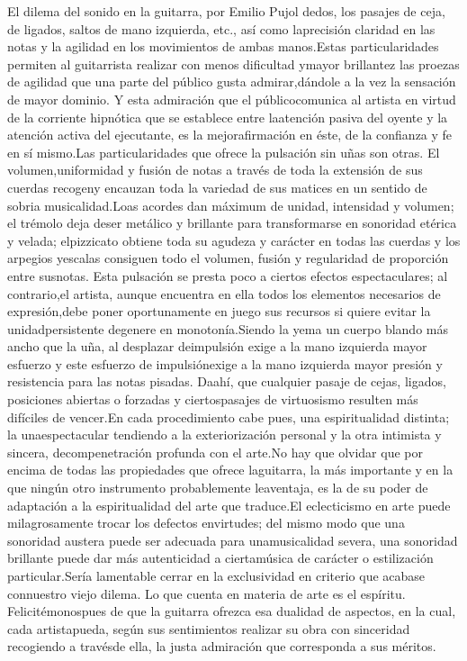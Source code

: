 \documentclass[
10pt, %
a4paper, %
oneside, %
headinclude,footinclude, %
BCOR5mm, %
]{scrartcl}
\begin{document}
{El dilema del sonido en la guitarra, por Emilio Pujol
dedos, los pasajes de ceja, de ligados, saltos de mano izquierda, etc., así como laprecisión claridad en las notas y la agilidad en los movimientos de ambas manos.Estas particularidades permiten al guitarrista realizar con menos dificultad ymayor brillantez las proezas de agilidad que una parte del público gusta admirar,dándole a la vez la sensación de mayor dominio. Y esta admiración que el públicocomunica al artista en virtud de la corriente hipnótica que se establece entre laatención pasiva del oyente y la atención activa del ejecutante, es la mejorafirmación en éste, de la confianza y fe en sí mismo.Las particularidades que ofrece la pulsación sin uñas son otras. El volumen,uniformidad y fusión de notas a través de toda la extensión de sus cuerdas recogeny encauzan toda la variedad de sus matices en un sentido de sobria musicalidad.Loas acordes dan máximum de unidad, intensidad y volumen; el trémolo deja deser metálico y brillante para transformarse en sonoridad etérica y velada; elpizzicato obtiene toda su agudeza y carácter en todas las cuerdas y los arpegios yescalas consiguen todo el volumen, fusión y regularidad de proporción entre susnotas. Esta pulsación se presta poco a ciertos efectos espectaculares; al contrario,el artista, aunque encuentra en ella todos los elementos necesarios de expresión,debe poner oportunamente en juego sus recursos si quiere evitar la unidadpersistente degenere en monotonía.Siendo la yema un cuerpo blando más ancho que la uña, al desplazar deimpulsión exige a la mano izquierda mayor esfuerzo y este esfuerzo de impulsiónexige a la mano izquierda mayor presión y resistencia para las notas pisadas. Daahí, que cualquier pasaje de cejas, ligados, posiciones abiertas o forzadas y ciertospasajes de virtuosismo resulten más difíciles de vencer.En cada procedimiento cabe pues, una espiritualidad distinta; la unaespectacular tendiendo a la exteriorización personal y la otra intimista y sincera, decompenetración profunda con el arte.No hay que olvidar que por encima de todas las propiedades que ofrece laguitarra, la más importante y en la que ningún otro instrumento probablemente leaventaja, es la de su poder de adaptación a la espiritualidad del arte que traduce.El eclecticismo en arte puede milagrosamente trocar los defectos envirtudes; del mismo modo que una sonoridad austera puede ser adecuada para unamusicalidad severa, una sonoridad brillante puede dar más autenticidad a ciertamúsica de carácter o estilización particular.Sería lamentable cerrar en la exclusividad en criterio que acabase connuestro viejo dilema. Lo que cuenta en materia de arte es el espíritu. Felicitémonospues de que la guitarra ofrezca esa dualidad de aspectos, en la cual, cada artistapueda, según sus sentimientos realizar su obra con sinceridad recogiendo a travésde ella, la justa admiración que corresponda a sus méritos.}
\end{document}
